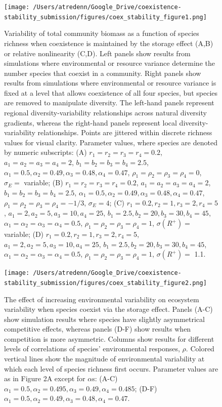 \documentclass[12pt,]{article}
\begin{document}
\begin{figure}[!ht]
  \centering
      \texttt{[image: /Users/atredenn/Google\_Drive/coexistence-stability\_submission/figures/coex\_stability\_figure1.png]}
  \caption{Variability of total community biomass as a function of species richness when coexistence is maintained by the storage effect (A,B) or relative nonlinearity (C,D). Left panels show results from simulations where environmental or resource variance determine the number species that coexist in a community. Right panels show results from simulations where environmental or resource variance is fixed at a level that allows coexistence of all four species, but species are removed to manipulate diversity. The left-hand panels represent regional diversity-variability relationships across natural diversity gradients, whereas the right-hand panels represent local diversity-variability relationships. Points are jittered within discrete richness values for visual clarity. Parameter values, where species are denoted by numeric subscripts: (A) $r_1 = r_2 = r_3 = r_4 = 0.2$, $a_1 = a_2 = a_3 = a_4 = 2$, $b_1 = b_2 = b_3 = b_4 = 2.5$, $\alpha_1 = 0.5, \alpha_2 = 0.49, \alpha_3 = 0.48, \alpha_4 = 0.47$, $\rho_1 = \rho_2 = \rho_3 = \rho_4 = 0$, $\sigma_E =$ variable; (B) $r_1 = r_2 = r_3 = r_4 = 0.2$, $a_1 = a_2 = a_3 = a_4 = 2$, $b_1 = b_2 = b_3 = b_4 = 2.5$, $\alpha_1 = 0.5, \alpha_2 = 0.49, \alpha_3 = 0.48, \alpha_4 = 0.47$, $\rho_1 = \rho_2 = \rho_3 = \rho_4 = -1/3$, $\sigma_E = 4$; (C) $r_1 = 0.2, r_2 = 1, r_3 = 2, r_4 = 5$, $a_1 = 2, a_2 = 5, a_3 = 10, a_4 = 25$, $b_1 = 2.5, b_2 = 20, b_3 = 30, b_4 = 45$, $\alpha_1 = \alpha_2 = \alpha_3 = \alpha_4 = 0.5$, $\rho_1 = \rho_2 = \rho_3 = \rho_4 = 1$, $\sigma(R^+) =$ variable; (D) $r_1 = 0.2, r_2 = 1, r_3 = 2, r_4 = 5$, $a_1 = 2, a_2 = 5, a_3 = 10, a_4 = 25$, $b_1 = 2.5, b_2 = 20, b_3 = 30, b_4 = 45$, $\alpha_1 = \alpha_2 = \alpha_3 = \alpha_4 = 0.5$, $\rho_1 = \rho_2 = \rho_3 = \rho_4 = 1$, $\sigma(R^+) =$ 1.1.}
\end{figure}

\newpage{}

\begin{figure}[!ht]
  \centering
      \texttt{[image: /Users/atredenn/Google\_Drive/coexistence-stability\_submission/figures/coex\_stability\_figure2.png]}
  \caption{The effect of increasing environmental variability on ecosystem variability when species coexist via the storage effect. Panels (A-C) show simulation results where species have slightly asymmetrical competitive effects, whereas panels (D-F) show results when competition is more asymmetric. Columns show results for different levels of correlations of species' environmental responses, $\rho$. Colored vertical lines show the magnitude of environmental variability at which each level of species richness first occurs. Parameter values are as in Figure 2A except for $\alpha$s: (A-C) $\alpha_1 = 0.5, \alpha_2 = 0.495, \alpha_3 = 0.49, \alpha_4 = 0.485$; (D-F) $\alpha_1 = 0.5, \alpha_2 = 0.49, \alpha_3 = 0.48, \alpha_4 = 0.47$.}
\end{figure}
\end{document}
